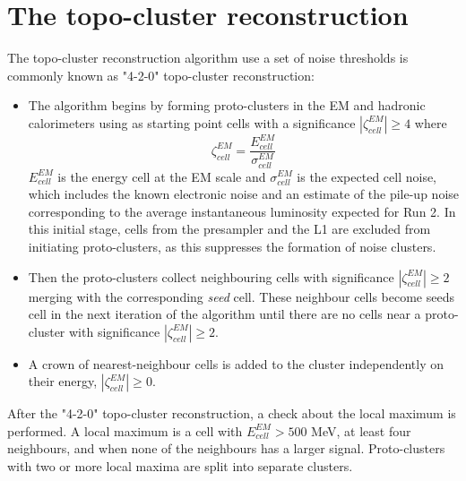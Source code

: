 \documentclass[a4paper, oneside, 11pt, openright]{book}
\begin{document}
		\section{The topo-cluster reconstruction}\label{section:topo cluster}
			The topo-cluster reconstruction algorithm \cite{topo_cluster} use a set of noise thresholds is commonly known as "4-2-0" topo-cluster reconstruction:
			\begin{itemize}
				\item The algorithm begins by forming proto-clusters in the EM and hadronic calorimeters using as starting point cells with a significance $|\zeta_{cell}^{EM}| \geq 4$ where 
				$$
				\zeta_{cell}^{EM} = \frac{E_{cell}^{EM}}{\sigma_{cell}^{EM}}
				$$		
				$E_{cell}^{EM}$ is the energy cell at the EM scale and $\sigma_{cell}^{EM}$ is the expected cell noise, which includes the known electronic noise and an estimate of the pile-up noise corresponding to the average instantaneous luminosity expected for Run 2. In this initial stage, cells from the presampler and the L1 are excluded from initiating proto-clusters, as this suppresses the formation of noise clusters.
				\item Then the proto-clusters collect neighbouring cells with significance $|\zeta_{cell}^{EM}| \geq 2$ merging with the corresponding \textit{seed} cell. These neighbour cells become seeds cell in the next iteration of the algorithm until there are no cells near a proto-cluster with significance $|\zeta_{cell}^{EM}| \geq 2$.
				\item A crown of nearest-neighbour cells is added to the cluster independently on their energy, $|\zeta_{cell}^{EM}| \geq 0$.
			\end{itemize}
			
			After the "4-2-0" topo-cluster reconstruction, a check about the local maximum is performed. A local maximum is a cell with $E^{EM}_{cell} > 500$ MeV, at least four neighbours, and when none of the neighbours has a larger signal. Proto-clusters with two or more local maxima are split into separate clusters.
		
\end{document}
